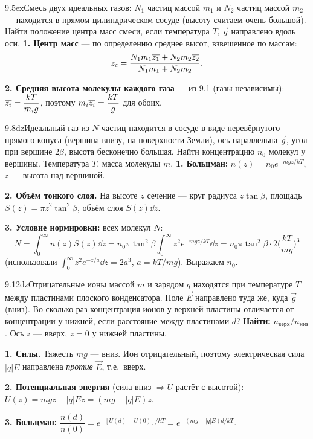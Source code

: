 \begin{problem}{9.5}{ex}{Смесь двух идеальных газов: $N_1$ частиц массой $m_1$ и $N_2$ частиц массой $m_2$ — находится в прямом
цилиндрическом сосуде (высоту считаем очень большой). Найти положение центра масс смеси, если температура $T$, $\vec g$ направлено вдоль оси.}
\textbf{1. Центр масс} — по определению среднее высот, взвешенное по массам:
\[z_c=\frac{N_1m_1\overline{z_1}+N_2m_2\overline{z_2}}{N_1m_1+N_2m_2}.\]

\textbf{2. Средняя высота молекулы каждого газа} — из 9.1 (газы независимы): $\overline{z_i}=\dfrac{kT}{m_ig}$, поэтому $m_i\overline{z_i}=\dfrac{kT}{g}$ для обоих.
\end{problem}

\begin{problem}{9.8}{dz}{Идеальный газ из $N$ частиц находится в сосуде в виде перевёрнутого прямого конуса (вершина внизу, на поверхности Земли),
ось параллельна $\vec g$, угол при вершине $2\beta$, высота бесконечно большая. Найти концентрацию $n_0$ молекул у вершины. Температура $T$, масса молекулы $m$.}
\textbf{1. Больцман:} $n(z)=n_0e^{-mgz/kT}$, $z$ — высота над вершиной.

\textbf{2. Объём тонкого слоя.} На высоте $z$ сечение — круг радиуса $z\tan\beta$, площадь $S(z)=\pi z^2\tan^2\beta$, объём слоя $S(z)\dd z$.

\textbf{3. Условие нормировки:} всех молекул $N$:
\[N=\int_0^\infty n(z)S(z)\dd z=n_0\pi\tan^2\beta\int_0^\infty z^2e^{-mgz/kT}\dd z=n_0\pi\tan^2\beta\cdot2\Big(\frac{kT}{mg}\Big)^3\]
(использовали $\int_0^\infty z^2e^{-z/a}\dd z=2a^3$, $a=kT/mg$). Выражаем $n_0$.
\end{problem}

\begin{problem}{9.12}{dz}{Отрицательные ионы массой $m$ и зарядом $q$ находятся при температуре $T$ между пластинами плоского конденсатора.
Поле $\vec E$ направлено туда же, куда $\vec g$ (вниз). Во сколько раз концентрация ионов у верхней пластины отличается от
концентрации у нижней, если расстояние между пластинами $d$?}
\textbf{Найти:} $n_{\text{верх}}/n_{\text{низ}}$. Ось $z$ — вверх, $z=0$ у нижней пластины.

\textbf{1. Силы.} Тяжесть $mg$ — вниз. Ион отрицательный, поэтому электрическая сила $|q|E$ направлена \emph{против} $\vec E$, т.е.\ вверх.

\textbf{2. Потенциальная энергия} (сила вниз $\Rightarrow U$ растёт с высотой):
$U(z)=mgz-|q|Ez=(mg-|q|E)z$.

\textbf{3. Больцман:} $\dfrac{n(d)}{n(0)}=e^{-[U(d)-U(0)]/kT}=e^{-(mg-|q|E)d/kT}$.
\end{problem}

